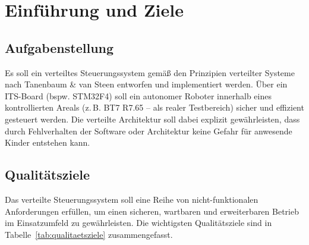\chapter{Einführung und Ziele}

\section{Aufgabenstellung}

Es soll ein verteiltes Steuerungssystem gemäß den Prinzipien verteilter Systeme nach Tanenbaum & van Steen entworfen und implementiert werden. Über ein ITS-Board (bspw. STM32F4) soll ein autonomer Roboter innerhalb eines kontrollierten Areals (z. B. BT7 R7.65 – als realer Testbereich) sicher und effizient gesteuert werden. Die verteilte Architektur soll dabei explizit gewährleisten, dass durch Fehlverhalten der Software oder Architektur keine Gefahr für anwesende Kinder entstehen kann.

\section{Qualitätsziele}

Das verteilte Steuerungssystem soll eine Reihe von nicht-funktionalen Anforderungen erfüllen, um einen sicheren, wartbaren und erweiterbaren Betrieb im Einsatzumfeld zu gewährleisten. Die wichtigsten Qualitätsziele sind in Tabelle~\ref{tab:qualitaetsziele} zusammengefasst.

